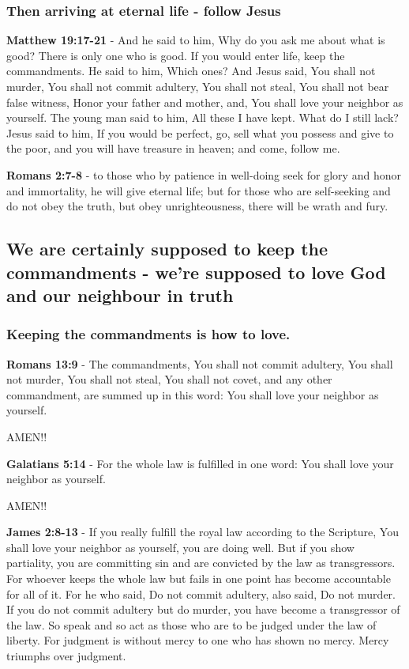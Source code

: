 \documentclass[11pt]{article}
\begin{document}
\subsubsection{Then arriving at eternal life - follow Jesus}
\label{sec:org9a6de2a}
\textbf{Matthew 19:17-21} - And he said to him, Why do you ask me about what is good? There is only one who is good. If you would enter life, keep the commandments. He said to him, Which ones? And Jesus said, You shall not murder, You shall not commit adultery, You shall not steal, You shall not bear false witness, Honor your father and mother, and, You shall love your neighbor as yourself. The young man said to him, All these I have kept. What do I still lack? Jesus said to him, If you would be perfect, go, sell what you possess and give to the poor, and you will have treasure in heaven; and come, follow me.

\textbf{Romans 2:7-8} - to those who by patience in well-doing seek for glory and honor and immortality, he will give eternal life; but for those who are self-seeking and do not obey the truth, but obey unrighteousness, there will be wrath and fury.

\subsection{We are certainly supposed to keep the commandments - we're supposed to love God and our neighbour in truth}
\label{sec:org2a19ad8}
\subsubsection{Keeping the commandments is how to love.}
\label{sec:orge114089}

\textbf{Romans 13:9} - The commandments, You shall not commit adultery, You shall not murder, You shall not steal, You shall not covet, and any other commandment, are summed up in this word: You shall love your neighbor as yourself.

AMEN!!

\textbf{Galatians 5:14} - For the whole law is fulfilled in one word: You shall love your neighbor as yourself.

AMEN!!

\textbf{James 2:8-13} - If you really fulfill the royal law according to the Scripture, You shall love your neighbor as yourself, you are doing well. But if you show partiality, you are committing sin and are convicted by the law as transgressors. For whoever keeps the whole law but fails in one point has become accountable for all of it. For he who said, Do not commit adultery, also said, Do not murder. If you do not commit adultery but do murder, you have become a transgressor of the law. So speak and so act as those who are to be judged under the law of liberty. For judgment is without mercy to one who has shown no mercy. Mercy triumphs over judgment.
\end{document}
